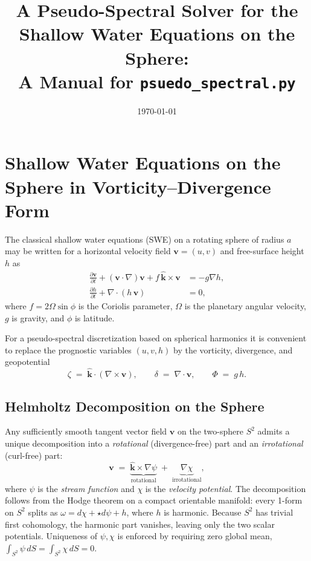 \documentclass[11pt]{article}
\title{A Pseudo-Spectral Solver for the Shallow Water Equations on the Sphere:\\
       A Manual for \texttt{psuedo\_spectral.py}}
\author{}
\date{\today}
\newcommand{\bvec}[1]{\boldsymbol{#1}}
\begin{document}
\maketitle

\tableofcontents
\bigskip

\section{Shallow Water Equations on the Sphere in
         Vorticity--Divergence Form}

The classical shallow water equations (SWE) on a rotating sphere of radius
$a$ may be written for a horizontal velocity field
$\bvec{v} = (u,v)$ and free-surface height $h$ as
\begin{align}
    \frac{\partial \bvec{v}}{\partial t} + (\bvec{v}\cdot \nabla)\bvec{v}
        + f\,\hat{\bvec{k}}\times\bvec{v}
        &= -g\nabla h, \label{eq:mom}\\
    \frac{\partial h}{\partial t} + \nabla\cdot(h\,\bvec{v}) &= 0,
        \label{eq:cont}
\end{align}
where $f = 2\Omega\sin\phi$ is the Coriolis parameter, $\Omega$ is the
planetary angular velocity, $g$ is gravity, and $\phi$ is latitude.

For a pseudo-spectral discretization based on spherical harmonics it is
convenient to replace the prognostic variables $(u,v,h)$ by the
vorticity, divergence, and geopotential
\begin{equation}
    \zeta \;=\; \hat{\bvec{k}}\cdot(\nabla\times\bvec{v}),
    \qquad
    \delta \;=\; \nabla\cdot\bvec{v},
    \qquad
    \Phi \;=\; g\,h .
\end{equation}
\subsection{Helmholtz Decomposition on the Sphere}

Any sufficiently smooth tangent vector field $\bvec{v}$ on the
two-sphere $S^{2}$ admits a unique decomposition into a
\emph{rotational} (divergence-free) part and an \emph{irrotational}
(curl-free) part:
\begin{equation}
    \bvec{v} \;=\;
        \underbrace{\hat{\bvec{k}}\times\nabla\psi}_{\text{rotational}}
        \;+\;
        \underbrace{\nabla\chi}_{\text{irrotational}},
    \label{eq:helmholtz}
\end{equation}
where $\psi$ is the \emph{stream function} and $\chi$ is the
\emph{velocity potential}.  The decomposition follows from the Hodge
theorem on a compact orientable manifold: every 1-form on $S^{2}$
splits as $\omega = d\chi + \star d\psi + h$, where $h$ is harmonic.
Because $S^{2}$ has trivial first cohomology, the harmonic part
vanishes, leaving only the two scalar potentials.  Uniqueness of
$\psi,\chi$ is enforced by requiring zero global mean,
$\int_{S^{2}}\psi\,dS = \int_{S^{2}}\chi\,dS = 0$.
\end{document}
